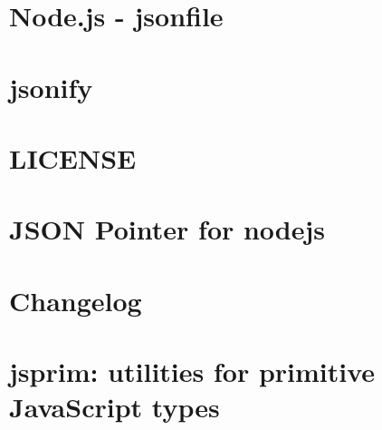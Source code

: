 \documentclass[twoside]{book}
\newcommand{\+}{\discretionary{\mbox{\scriptsize$\hookleftarrow$}}{}{}}
\begin{document}
\chapter{Node.\+js -\/ jsonfile}
\label{md__c_1_workspace_demo_src_main_script_node_modules_jsonfile__r_e_a_d_m_e}

\chapter{jsonify}
\label{md__c_1_workspace_demo_src_main_script_node_modules_jsonify__r_e_a_d_m_e}

\chapter{L\+I\+C\+E\+N\+SE}
\label{md__c_1_workspace_demo_src_main_script_node_modules_jsonpointer__l_i_c_e_n_s_e}

\chapter{J\+S\+ON Pointer for nodejs}
\label{md__c_1_workspace_demo_src_main_script_node_modules_jsonpointer__r_e_a_d_m_e}

\chapter{Changelog}
\label{md__c_1_workspace_demo_src_main_script_node_modules_jsprim__c_h_a_n_g_e_s}

\chapter{jsprim\+: utilities for primitive Java\+Script types}
\label{md__c_1_workspace_demo_src_main_script_node_modules_jsprim__r_e_a_d_m_e}

\end{document}
